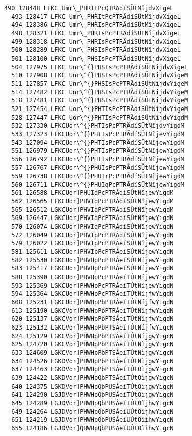 \documentclass[11pt]{article}
\begin{document}
\begin{Verbatim}[commandchars=\\\{\}]
  490 128448 LFKC Umr\_PHRItPcQTRÄdíSÜtMîjdvXigeL
  493 128417 LFKC Umr\_PHRItPcPTRÄdíSÜtMîjdvXigeL
  494 128386 LFKC Umr\_PHRIsPcPTRÄdíSÜtMîjdvXigeL
  498 128321 LFKC Umr\_PHRIsPcPTRÄdíSÜtNîjdvXigeL
  499 128318 LFKC Unr\_PHRIsPcPTRÄdíSÜtNîjdvXigeL
  500 128289 LFKC Unr\_PHSIsPcPTRÄdíSÜtNîjdvXigeL
  501 128100 LFKC Unr\_PHSIsPcPTRÃdíSÜtNîjdvXigeL
  504 127975 LFKC Unr\^{}PHSIsPcPTRÃdíSÜtNîjdvXigeL
  510 127908 LFKC Unr\^{}PHSIsPcPTRÃdíSÜtNîjdvXigeM
  511 127857 LFKC Unr\^{}PHSIsPcPTRÃdíSÜtNîjdvYigeM
  514 127482 LFKC Unr\^{}PHSIsPcPTRÃdíSÛtNîjdvYigeM
  518 127481 LFKC Uor\^{}PHSIsPcPTRÃdíSÛtNîjdvYigeM
  521 127454 LFKC Uor\^{}PHTIsPcPTRÃdíSÛtNîjdvYigeM
  528 127447 LFKC Uor\^{}PHTIsPcPTRÃdíSÛtNîjdvYigdM
  532 127330 LFKCUor\^{}PHTIsPcPTRÃdíSÛtNîjdvYigdM
  533 127323 LFKCUor\^{}PHTIsPcPTRÃdíSÛtNîjevYigdM
  543 127094 LFKCUor\^{}PHTIsPcPTRÃdíSÛtNîjewYigdM
  551 126979 LFKCUor\^{}PHTIsPcPTRÃdíSÛtNîjewYigdM
  556 126792 LFKCUor\^{}PHTIsPcPTRÂdíSÛtNîjewYigdM
  557 126767 LFKCUor\^{}PHUIsPcPTRÂdíSÛtNîjewYigdM
  559 126738 LFKCUor\^{}PHUIrPcPTRÂdíSÛtNîjewYigdM
  560 126711 LFKCUor\^{}PHUIqPcPTRÂdíSÛtNîjewYigdM
  561 126588 LFKCUor]PHUIqPcPTRÂdíSÛtNîjewYigdM
  562 126565 LFKCUor]PHVIqPcPTRÂdíSÛtNîjewYigdM
  565 126512 LGKCUor]PHVIqPcPTRÂdíSÛtNîjewYigdM
  569 126447 LGKCUor]PHVIqPcPTRÂdíSÛtNîjewYigdN
  570 126074 LGKCUor]PHVIqPcPTRÂdíSÚtNîjewYigdN
  572 126049 LGKCUor]PHVIpPcPTRÂdíSÚtNîjewYigdN
  579 126022 LGKCUor]PHVIpPcPTRÂeíSÚtNîjewYigdN
  581 125611 LGKCUor]PHVIpPcPTRÂeíSÚtNíjewYigdN
  582 125530 LGKCUor]PHVHpPcPTRÂeíSÚtNíjewYigdN
  583 125417 LGKCUor]PHVHpPcPTRÂeíSÚtNíjewYigdN
  588 125390 LGKCUor]PHVHpPcPTRÂeíTÚtNíjewYigdN
  593 125369 LGKCUor]PHWHpPcPTRÂeíTÚtNíjewYigdN
  594 125364 LGKCUor]PHWHpPcPTRÂeíTÚtNíjfwYigdN
  608 125231 LGKCUor]PHWHpPbPTRÂeíTÚtNíjfwYigdN
  613 125190 LGKCVor]PHWHpPbPTRÂeíTÚtNíjfwYigdN
  620 125137 LGKCVor]PHWHpPbPTSÂeíTÚtNíjfwYigdN
  623 125132 LGKCVor]PHWHpPbPTSÂeíTÚtNíjfwYigcN
  624 125129 LGKCVor]PHWHpPbPTSÂeíTÚtNíjgwYigcN
  625 124720 LGKCVor]PHWHpPbPTSÂeíTÚtNìjgwYigcN
  633 124609 LGKCVor]PHWHpPbPTSÂeíTÚtNìjgwYigcN
  634 124526 LGKDVor]PHWHpPbPTSÂeíTÚtNìjgwYigcN
  637 124463 LGKDVor]PHWHpPbPTSÂeíTÚtOìjgwYigcN
  639 124422 LGKDVor]PHWHpQbPTSÂeíTÚtOìjgwYigcN
  640 124375 LGKDVor]PHWHpQbPUSÂeíTÚtOìjgwYigcN
  641 124290 LGJDVor]PHWHpQbPUSÂeíTÚtOìjgwYigcN
  645 124289 LGJDVor]PHWHpQbPUSÂeíTÚtOìjhwYigcN
  649 124264 LGJDVor]PHWHpQbPUSÂeíUÚtOìjhwYigcN
  651 124219 LGJDVor]PHWHpQbPUSÂeíUÚtOìihwYigcN
  655 124186 LGJDVor]QHWHpQbPUSÂeíUÚtOìihwYigcN

\end{Verbatim}
\end{document}
